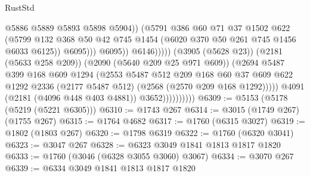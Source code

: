 \begin{lexlean}{RustStd}
\begin{coremodule}
                                                @5886
                                                @5889
                                                @5893
                                                @5898
                                                @5904))
                                            (@5791
                                              @386
                                              @60
                                              @71
                                              @37
                                              @1502
                                              @622
                                              (@5799
                                                @132
                                                @368
                                                @50
                                                @42
                                                @745
                                                @1454
                                                (@6020 @370 @50 @261 @745 @1456 @6033 @6125))
                                              @6095)))
                                        @6095))
                                    @6146)))))
                          (@3905 (@5628 @23))
                          (@2181 (@5633 @258 @209))
                          (@2090 (@5640 @209 @25 @971 @609))
                          (@2694
                            @5487
                            @399
                            @168
                            @609
                            @1294
                            (@2553
                              @5487
                              @512
                              @209
                              @168
                              @60
                              @37
                              @609
                              @622
                              @1292
                              @2336
                              (@2177 @5487 @512)
                              (@2568 (@2570 @209 @168 @1292)))))
                        @4091
                        (@2181 (@4096 @448 @403 @4881))
                        @3652))))))))))
@6309 := @5153 (@5178 (@5219 (@5221 @6305)))
@6310 := @1743 @267
@6314 := @3015 (@1749 @267) (@1755 @267)
@6315 := @1764 @4682
@6317 := @1760 (@6315 @3027)
@6319 := @1802 (@1803 @267)
@6320 := @1798 @6319
@6322 := @1760 (@6320 @3041)
@6323 := @3047 @267
@6328 := @6323 @3049 @1841 @1813 @1817 @1820
@6333 := @1760 (@3046 (@6328 @3055 @3060) @3067)
@6334 := @3070 @267
@6339 := @6334 @3049 @1841 @1813 @1817 @1820

\end{coremodule}
\end{lexlean}
